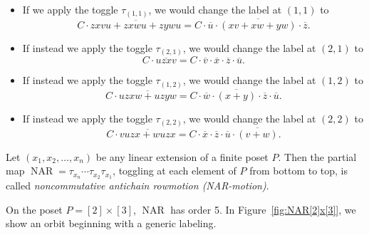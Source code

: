 \documentclass[ALCO,ThmDefs,Unicode,epreuves]{cedram}
\newcommand{\defn}[1]{\emph{#1}}
\DeclareMathOperator{\NAR}{NAR}
\begin{document}
\begin{exam}
\begin{itemize}
\item If we apply the toggle $\tau_{(1,1)}$,
we would change the label at $(1,1)$ to
\[
C\cdot \overline{zxvu+zxwu+zywu}=
C\cdot \overline{u}\cdot\overline{(xv+xw+yw)}
\cdot\overline{z}.
\]
\item If instead we apply the toggle $\tau_{(2,1)}$,
we would change the label at $(2,1)$ to
\[
C\cdot \overline{uzxv}
=C\cdot \overline{v}\cdot \overline{x}\cdot \overline{z}\cdot \overline{u}.
\]
\item If instead we apply the toggle $\tau_{(1,2)}$,
we would change the label at $(1,2)$ to
\[
C\cdot \overline{uzxw+uzyw}
=C\cdot \overline{w}\cdot \overline{(x+y)}\cdot \overline{z}\cdot \overline{u}.
\]
\item If instead we apply the toggle $\tau_{(2,2)}$,
we would change the label at $(2,2)$ to
\[
C\cdot \overline{vuzx+wuzx}
=C\cdot \overline{x}\cdot \overline{z}\cdot \overline{u}\cdot \overline{(v+w)}.
\]
\end{itemize}
\end{exam}

\begin{defi}
Let $(x_1,x_2,\dots,x_n)$ be any linear extension of a finite poset $P$. Then the partial map $\NAR=\tau_{x_n}\cdots \tau_{x_2} \tau_{x_1}$, \ie toggling at each element of $P$
from bottom to top, is called \defn{noncommutative antichain rowmotion (NAR-motion)}.
\end{defi}

\begin{exam}\label{ex:NAR[2]x[3]}
On the poset $P=[2]\times[3]$, $\NAR$ has order 5.
In Figure~\ref{fig:NAR[2]x[3]}, we show an orbit beginning with a generic labeling.
\end{exam}
\end{document}
